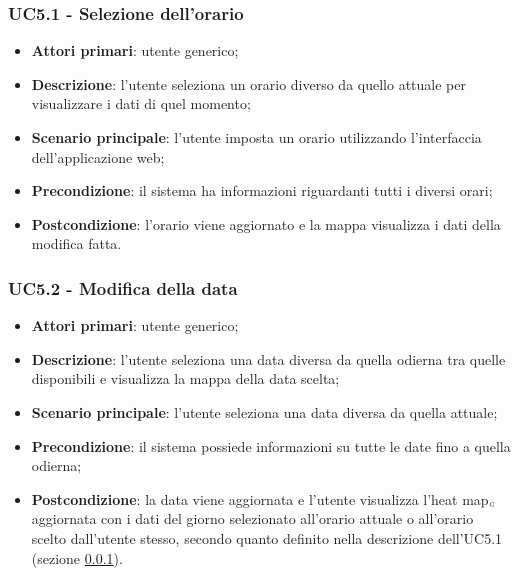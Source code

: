 \subsubsection{UC5.1 - Selezione dell’orario}\label{CasiDUsoCasiDUsoTraUnUtenteEIlFrontEndElencoCasiDUsoUC51SelezioneDellOrario}
\begin{itemize}
	\item \textbf{Attori primari}: utente generico;
	\item \textbf{Descrizione}: l’utente seleziona un orario diverso da quello attuale per visualizzare i dati di quel momento;
	\item \textbf{Scenario principale}: l’utente imposta un orario utilizzando l’interfaccia dell’applicazione web;
	\item \textbf{Precondizione}: il sistema ha informazioni riguardanti tutti i diversi orari; %
	\item \textbf{Postcondizione}:  l’orario viene aggiornato e la mappa visualizza i dati della modifica fatta.
\end{itemize}

\subsubsection{UC5.2 - Modifica della data}\label{CasiDUsoCasiDUsoTraUnUtenteEIlFrontEndElencoCasiDUsoUC52ModificaDellaData}
\begin{itemize}
	\item \textbf{Attori primari}: utente generico;
	\item \textbf{Descrizione}: l’utente seleziona una data diversa da quella odierna tra quelle disponibili e visualizza la mappa della data scelta;
	\item \textbf{Scenario principale}: l’utente seleziona una data diversa da quella attuale;
	\item \textbf{Precondizione}: il sistema possiede informazioni su tutte le date fino a quella odierna;
	\item \textbf{Postcondizione}: la data viene aggiornata e l’utente visualizza l’heat map$_{\scaleto{G}{3pt}}$ aggiornata con i dati del giorno selezionato all’orario attuale o all’orario scelto dall’utente stesso, secondo quanto definito nella descrizione dell’UC5.1 (sezione \ref{CasiDUsoCasiDUsoTraUnUtenteEIlFrontEndElencoCasiDUsoUC51SelezioneDellOrario}).
\end{itemize}

